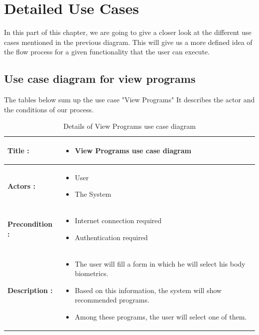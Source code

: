 \documentclass[12pt,a4paper]{report}
\begin{document}
\section{Detailed Use Cases}
In this part of this chapter, we are going to give a closer look at the different use cases mentioned in the previous diagram. This will give us a more defined idea of the flow process for a given functionality that the user can execute.
\subsection{Use case diagram for view programs}
The tables below sum up the use case "View Programs" It describes the actor and the conditions of our process.
\begin{table}[H]
    \centering
    \renewcommand{\arraystretch}{2.3} 
    \caption{Details of View Programs use case diagram}
    \vspace{0.4em}
        \begin{tabular}{|p{3.5cm}|p{8.5cm}|}
        \hline
        \textbf{Title :} & 
        \begin{itemize}[label=$\bullet$, leftmargin=*, nosep, before=\vspace{-0.6\baselineskip}]
            \item View Programs use case diagram
        \end{itemize} \\ \hline
        
        \textbf{Actors :} & 
        \begin{itemize}[label=$\bullet$, leftmargin=*, nosep, before=\vspace{-0.6\baselineskip}]
            \item User
            \item The System
        \end{itemize} \\ \hline
        
        \textbf{Precondition :} & 
        \begin{itemize}[label=$\bullet$, leftmargin=*, nosep, before=\vspace{-0.6\baselineskip}]
            \item Internet connection required
            \item Authentication required
        \end{itemize} \\ \hline
        
        \textbf{Description :} & 
        \begin{itemize}[label=$\bullet$, leftmargin=*, nosep, before=\vspace{-0.6\baselineskip}]
            \item The user will fill a form in which he will select his body biometrics.
            \item Based on this information, the system will show recommended programs.
            \item Among these programs, the user will select one of them.
        \end{itemize} \\ \hline
        

\end{tabular}
\end{table}
\end{document}
